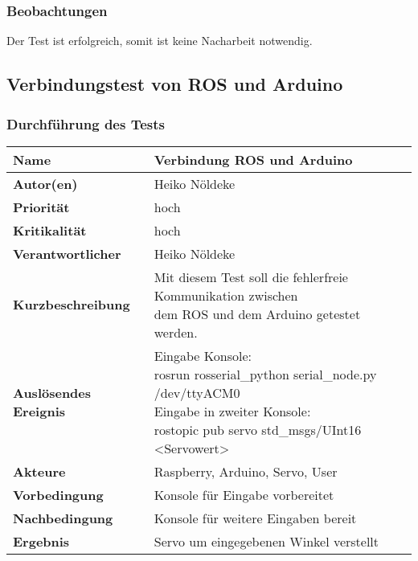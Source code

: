 \subsubsection{Beobachtungen}
Der Test ist erfolgreich, somit ist keine Nacharbeit notwendig.

\newpage

\subsection{Verbindungstest von ROS und Arduino}
\subsubsection{Durchführung des Tests}
\begin{tabularx}{\columnwidth}{|p{4cm}|X|}
	\hline
	\textbf{Name} & Verbindung ROS und Arduino\\
	\hline
	\textbf{Autor(en)} & Heiko Nöldeke \\
	\hline
	\textbf{Priorität} & hoch\\	
	\hline	
	\textbf{Kritikalität} & hoch\\
	\hline
	\textbf{Verantwortlicher} & Heiko Nöldeke\\
	\hline
	\textbf{Kurzbeschreibung} & \makecell[tl]{Mit diesem Test soll die fehlerfreie Kommunikation zwischen\\ dem ROS und dem Arduino getestet werden.} \\
	\hline
	\textbf{Auslösendes Ereignis} &  \makecell[tl]{Eingabe Konsole:\\rosrun rosserial\_python serial\_node.py /dev/ttyACM0\\Eingabe in zweiter Konsole:\\rostopic pub servo std\_msgs/UInt16 <Servowert>}\\
	\hline
	\textbf{Akteure} & Raspberry, Arduino, Servo, User\\
	\hline
	\textbf{Vorbedingung} & Konsole für Eingabe vorbereitet\\
	\hline
	\textbf{Nachbedingung} & Konsole für weitere Eingaben bereit\\
	\hline
	\textbf{Ergebnis} & Servo um eingegebenen Winkel verstellt\\
	\hline
\end{tabularx}
\label{tab:TestCaseROSArduino}
\vspace{0.2cm}

